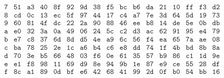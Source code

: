 \begin{table}[H]
\[\begin{array}{c|*{16}{c}}
\texttt{7} & \texttt{51} & \texttt{a3} & \texttt{40} & \texttt{8f} & \texttt{92} & \texttt{9d} & \texttt{38} & \texttt{f5} & \texttt{bc} & \texttt{b6} & \texttt{da} & \texttt{21} & \texttt{10} & \texttt{ff} & \texttt{f3} & \texttt{d2} \\
\texttt{8} & \texttt{cd} & \texttt{0c} & \texttt{13} & \texttt{ec} & \texttt{5f} & \texttt{97} & \texttt{44} & \texttt{17} & \texttt{c4} & \texttt{a7} & \texttt{7e} & \texttt{3d} & \texttt{64} & \texttt{5d} & \texttt{19} & \texttt{73} \\
\texttt{9} & \texttt{60} & \texttt{81} & \texttt{4f} & \texttt{dc} & \texttt{22} & \texttt{2a} & \texttt{90} & \texttt{88} & \texttt{46} & \texttt{ee} & \texttt{b8} & \texttt{14} & \texttt{de} & \texttt{5e} & \texttt{0b} & \texttt{db} \\
\texttt{a} & \texttt{e0} & \texttt{32} & \texttt{3a} & \texttt{0a} & \texttt{49} & \texttt{06} & \texttt{24} & \texttt{5c} & \texttt{c2} & \texttt{d3} & \texttt{ac} & \texttt{62} & \texttt{91} & \texttt{95} & \texttt{e4} & \texttt{79} \\
\texttt{b} & \texttt{e7} & \texttt{c8} & \texttt{37} & \texttt{6d} & \texttt{8d} & \texttt{d5} & \texttt{4e} & \texttt{a9} & \texttt{6c} & \texttt{56} & \texttt{f4} & \texttt{ea} & \texttt{65} & \texttt{7a} & \texttt{ae} & \texttt{08} \\
\texttt{c} & \texttt{ba} & \texttt{78} & \texttt{25} & \texttt{2e} & \texttt{1c} & \texttt{a6} & \texttt{b4} & \texttt{c6} & \texttt{e8} & \texttt{dd} & \texttt{74} & \texttt{1f} & \texttt{4b} & \texttt{bd} & \texttt{8b} & \texttt{8a} \\
\texttt{d} & \texttt{70} & \texttt{3e} & \texttt{b5} & \texttt{66} & \texttt{48} & \texttt{03} & \texttt{f6} & \texttt{0e} & \texttt{61} & \texttt{35} & \texttt{57} & \texttt{b9} & \texttt{86} & \texttt{c1} & \texttt{1d} & \texttt{9e} \\
\texttt{e} & \texttt{e1} & \texttt{f8} & \texttt{98} & \texttt{11} & \texttt{69} & \texttt{d9} & \texttt{8e} & \texttt{94} & \texttt{9b} & \texttt{1e} & \texttt{87} & \texttt{e9} & \texttt{ce} & \texttt{55} & \texttt{28} & \texttt{df} \\
\texttt{f} & \texttt{8c} & \texttt{a1} & \texttt{89} & \texttt{0d} & \texttt{bf} & \texttt{e6} & \texttt{42} & \texttt{68} & \texttt{41} & \texttt{99} & \texttt{2d} & \texttt{0f} & \texttt{b0} & \texttt{54} & \texttt{bb} & \texttt{16} \\
\end{array}
\]
\vspace{-1em}
\caption{S-box de AES}
\label{tab:sbox}
\end{table}

